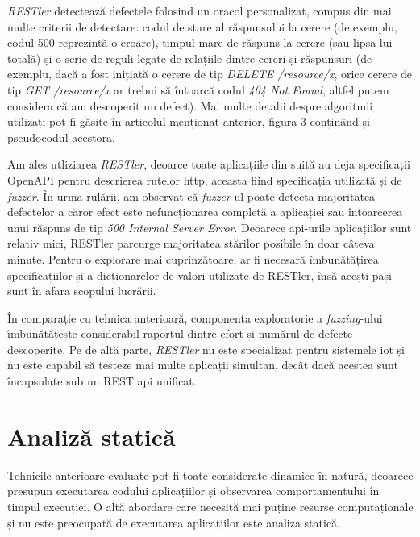 \textit{RESTler} detectează defectele folosind un oracol personalizat, compus din mai multe criterii de detectare: codul de stare al răspunsului la cerere (de exemplu, codul 500 reprezintă o eroare), timpul mare de răspuns la cerere (sau lipsa lui totală) și o serie de reguli legate de relațiile dintre cereri și răspunsuri (de exemplu, dacă a fost inițiată o cerere de tip \textit{DELETE /resource/x}, orice cerere de tip \textit{GET /resource/x} ar trebui să întoarcă codul \textit{404 Not Found}, altfel putem considera că am descoperit un defect). Mai multe detalii despre algoritmii utilizați pot fi găsite în articolul menționat anterior, figura 3 conținând și pseudocodul acestora.

Am ales utliziarea \textit{RESTler}, deoarce toate aplicațiile din suită au deja specificații OpenAPI pentru descrierea rutelor \acrshort{http}, aceasta fiind specificația utilizată și de \textit{fuzzer}. În urma rulării, am observat că \textit{fuzzer}-ul poate detecta majoritatea defectelor a căror efect este nefuncționarea completă a aplicației sau întoarcerea unui răspuns de tip \textit{500 Internal Server Error}. Deoarece \acrshort{api}-urile aplicațiilor sunt relativ mici, RESTler parcurge majoritatea stărilor posibile în doar câteva minute. Pentru o explorare mai cuprinzătoare, ar fi necesară îmbunătățirea specificațiilor și a dicționarelor de valori utilizate de RESTler, însă acești pași sunt în afara scopului lucrării.

În comparație cu tehnica anterioară, componenta exploratorie a \textit{fuzzing}-ului îmbunătățește considerabil raportul dintre efort și numărul de defecte descoperite. Pe de altă parte, \textit{RESTler} nu este specializat pentru sistemele \acrshort{iot} și nu este capabil să testeze mai multe aplicații simultan, decât dacă acestea sunt încapsulate sub un REST \acrshort{api} unificat.


\section{Analiză statică}

Tehnicile anterioare evaluate pot fi toate considerate dinamice în natură, deoarece presupun executarea codului aplicațiilor și observarea comportamentului în timpul execuției. O altă abordare care necesită mai puține resurse computaționale și nu este preocupată de executarea aplicațiilor este analiza statică. 

